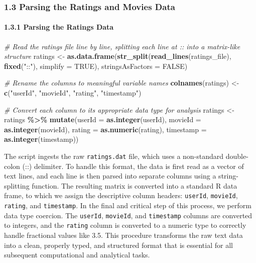 \documentclass[
]{article}
\newenvironment{Shaded}{\begin{snugshade}}{\end{snugshade}}
\newcommand{\AttributeTok}[1]{\textcolor[rgb]{0.13,0.29,0.53}{#1}}
\newcommand{\CommentTok}[1]{\textcolor[rgb]{0.56,0.35,0.01}{\textit{#1}}}
\newcommand{\ConstantTok}[1]{\textcolor[rgb]{0.56,0.35,0.01}{#1}}
\newcommand{\FunctionTok}[1]{\textcolor[rgb]{0.13,0.29,0.53}{\textbf{#1}}}
\newcommand{\NormalTok}[1]{#1}
\newcommand{\OtherTok}[1]{\textcolor[rgb]{0.56,0.35,0.01}{#1}}
\newcommand{\SpecialCharTok}[1]{\textcolor[rgb]{0.81,0.36,0.00}{\textbf{#1}}}
\newcommand{\StringTok}[1]{\textcolor[rgb]{0.31,0.60,0.02}{#1}}
\begin{document}
\subsubsection{1.3 Parsing the Ratings and Movies
Data}\label{parsing-the-ratings-and-movies-data}

\paragraph{1.3.1 Parsing the Ratings
Data}\label{parsing-the-ratings-data}

\begin{Shaded}
\begin{Highlighting}[]
\CommentTok{\# Read the ratings file line by line, splitting each line at \textquotesingle{}::\textquotesingle{} into a matrix{-}like structure}
\NormalTok{ratings }\OtherTok{\textless{}{-}} \FunctionTok{as.data.frame}\NormalTok{(}\FunctionTok{str\_split}\NormalTok{(}\FunctionTok{read\_lines}\NormalTok{(ratings\_file), }
                                   \FunctionTok{fixed}\NormalTok{(}\StringTok{"::"}\NormalTok{), }\AttributeTok{simplify =} \ConstantTok{TRUE}\NormalTok{), }
                         \AttributeTok{stringsAsFactors =} \ConstantTok{FALSE}\NormalTok{)}

\CommentTok{\# Rename the columns to meaningful variable names}
\FunctionTok{colnames}\NormalTok{(ratings) }\OtherTok{\textless{}{-}} \FunctionTok{c}\NormalTok{(}\StringTok{"userId"}\NormalTok{, }\StringTok{"movieId"}\NormalTok{, }\StringTok{"rating"}\NormalTok{, }\StringTok{"timestamp"}\NormalTok{)}

\CommentTok{\# Convert each column to its appropriate data type for analysis}
\NormalTok{ratings }\OtherTok{\textless{}{-}}\NormalTok{ ratings }\SpecialCharTok{\%\textgreater{}\%} 
  \FunctionTok{mutate}\NormalTok{(}\AttributeTok{userId =} \FunctionTok{as.integer}\NormalTok{(userId), }
         \AttributeTok{movieId =} \FunctionTok{as.integer}\NormalTok{(movieId), }
         \AttributeTok{rating =} \FunctionTok{as.numeric}\NormalTok{(rating), }
         \AttributeTok{timestamp =} \FunctionTok{as.integer}\NormalTok{(timestamp))}
\end{Highlighting}
\end{Shaded}

The script ingests the raw \texttt{ratings.dat} file, which uses a
non-standard double-colon (::) delimiter. To handle this format, the
data is first read as a vector of text lines, and each line is then
parsed into separate columns using a string-splitting function. The
resulting matrix is converted into a standard R data frame, to which we
assign the descriptive column headers: \texttt{userId},
\texttt{movieId}, \texttt{rating}, and \texttt{timestamp}. In the final
and critical step of this process, we perform data type coercion. The
\texttt{userId}, \texttt{movieId}, and \texttt{timestamp} columns are
converted to integers, and the \texttt{rating} column is converted to a
numeric type to correctly handle fractional values like 3.5. This
procedure transforms the raw text data into a clean, properly typed, and
structured format that is essential for all subsequent computational and
analytical tasks. \newpage
\end{document}
